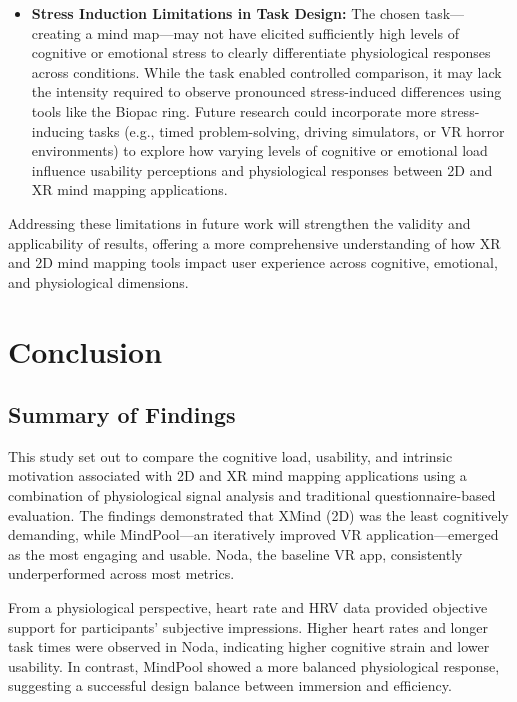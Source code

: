 \documentclass{CPP}
\begin{document}
\begin{itemize}
    \item \textbf{Stress Induction Limitations in Task Design:} The chosen task—creating a mind map—may not have elicited sufficiently high levels of cognitive or emotional stress to clearly differentiate physiological responses across conditions. While the task enabled controlled comparison, it may lack the intensity required to observe pronounced stress-induced differences using tools like the Biopac ring. Future research could incorporate more stress-inducing tasks (e.g., timed problem-solving, driving simulators, or VR horror environments) to explore how varying levels of cognitive or emotional load influence usability perceptions and physiological responses between 2D and XR mind mapping applications.
\end{itemize}

Addressing these limitations in future work will strengthen the validity and applicability of results, offering a more comprehensive understanding of how XR and 2D mind mapping tools impact user experience across cognitive, emotional, and physiological dimensions.



\newpage

\chapter{Conclusion}








\section{Summary of Findings}

This study set out to compare the cognitive load, usability, and intrinsic motivation associated with 2D and XR mind mapping applications using a combination of physiological signal analysis and traditional questionnaire-based evaluation. The findings demonstrated that XMind (2D) was the least cognitively demanding, while MindPool—an iteratively improved VR application—emerged as the most engaging and usable. Noda, the baseline VR app, consistently underperformed across most metrics.

From a physiological perspective, heart rate and HRV data provided objective support for participants' subjective impressions. Higher heart rates and longer task times were observed in Noda, indicating higher cognitive strain and lower usability. In contrast, MindPool showed a more balanced physiological response, suggesting a successful design balance between immersion and efficiency.
\end{document}
